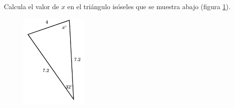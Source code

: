 \question[15]  Calcula el valor de $x$ en el triángulo isóseles  que se muestra abajo (figura \ref{fig:findangle13}).
\begin{figure}[H]
    \begin{center}
        \includegraphics[width=0.3\textwidth]{../images/findangle13.png}
    \end{center}
    \caption{}
    \label{fig:findangle13}
\end{figure}